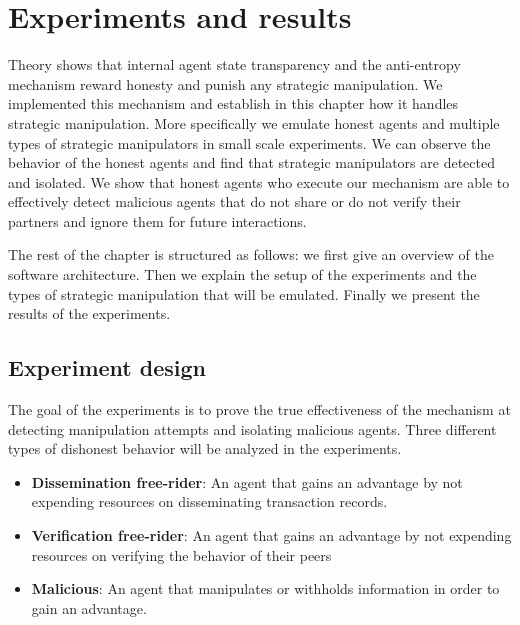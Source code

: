 \chapter{Experiments and results}
Theory shows that internal agent state transparency and the anti-entropy mechanism reward honesty
and punish any strategic manipulation. We implemented this mechanism and establish in this chapter
how it handles strategic manipulation. More specifically we emulate honest agents and multiple 
types of strategic manipulators in small scale experiments. We can observe the behavior of the 
honest agents and find that strategic manipulators are detected and isolated. We show that honest agents who
execute our mechanism are able to effectively detect malicious agents that do not share or do not verify their partners 
and ignore them for future interactions.

The rest of the chapter is structured as follows: we first give an overview of the software 
architecture. Then we explain the setup of the experiments and the types of strategic manipulation
that will be emulated. Finally we present the results of the experiments.


\section{Experiment design}
The goal of the experiments is to prove the true effectiveness of the mechanism at detecting 
manipulation attempts and isolating malicious agents. Three different types of dishonest behavior 
will be analyzed in the experiments.

\begin{itemize}
    \item \textbf{Dissemination free-rider}: An agent that gains an advantage by not 
    expending resources on disseminating transaction records.
    \item \textbf{Verification free-rider}: An agent that gains an advantage by not expending 
    resources on verifying the behavior of their peers
    \item \textbf{Malicious}: An agent that manipulates or withholds information in order to gain an
    advantage. 
\end{itemize}

